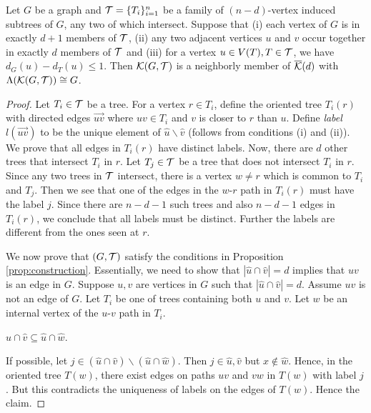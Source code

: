 \documentclass[11pt]{article}
\newcommand{\ovr}[1]{\overrightarrow{#1}}
\begin{document}
\begin{lemma}\label{lem:construction2}
Let $G$ be a graph and ${\cal T}=\{T_i\}_{i=1}^n$ be a family of $(n-d)$-vertex
induced subtrees of $G$, any two of which intersect. Suppose that {\rm (i)} each
vertex of $G$ is in exactly $d+1$ members of ${\cal T}$, {\rm (ii)} any two adjacent
vertices $u$ and $v$ occur together in exactly $d$ members of ${\cal T}$ and
{\rm (iii)} for a vertex $u\in V(T), T\in {\cal T}$, we have $d_G(u)-d_T(u)\leq 1$.
Then ${\cal K}(G, {\cal T})$ is a
neighborly member of $\overline{\cal K}(d)$ with $\Lambda({\cal K}(G, {\cal T}))\cong G$. 
\end{lemma}
\begin{proof}
Let $T_i\in {\cal T}$ be a tree. For a vertex $r\in T_i$, define the oriented tree
$T_i(r)$ with directed edges $\ovr{uv}$ where $uv\in T_i$ and $v$ is closer
to $r$ than $u$. Define {\em label} $l(\ovr{uv})$ to be the unique element of
$\hat{u}\backslash \hat{v}$ (follows from conditions (i) and (ii)). We prove
that all edges in $T_i(r)$ have distinct labels. Now, there are $d$ other trees
that intersect $T_i$ in $r$. Let $T_j\in {\cal T}$ be a tree that does not
intersect $T_i$ in $r$. Since any two trees in ${\cal T}$ intersect, there is a
vertex $w\neq r$ which is common to $T_i$ and $T_j$. Then we see that one of the
edges in the $w$-$r$ path in $T_i(r)$ must have the label $j$. Since there are
$n-d-1$ such trees and also $n-d-1$ edges in $T_i(r)$, we conclude that all
labels must be distinct. Further the labels are different from the ones seen at
$r$.

We now prove that $(G,{\cal T})$ satisfy the conditions in Proposition
\ref{prop:construction}. Essentially, we need to show that $|\hat{u}\cap
\hat{v}|=d$ implies that $uv$ is an edge in $G$.
Suppose $u,v$ are vertices in $G$
such that $|\hat{u}\cap \hat{v}|=d$. Assume $uv$ is not an edge of $G$. Let
$T_i$ be one of trees containing both $u$ and $v$. Let $w$ be an internal
vertex of the $u$-$v$ path in $T_i$.\smallskip

 $\hat{u}\cap \hat{v}\subseteq \hat{u}\cap \hat{w}$. 

If possible, let $j\in (\hat{u}\cap \hat{v})\backslash (\hat{u}\cap
\hat{w})$. Then $j\in \hat{u},\hat{v}$ but $x\not\in \hat{w}$. Hence, in
the oriented tree $T(w)$, there exist edges on paths $uv$ and $vw$ in
$T(w)$ with label $j$. But this contradicts the uniqueness of labels on the
edges of $T(w)$. Hence the claim.\smallskip


\end{proof}
\end{document}
